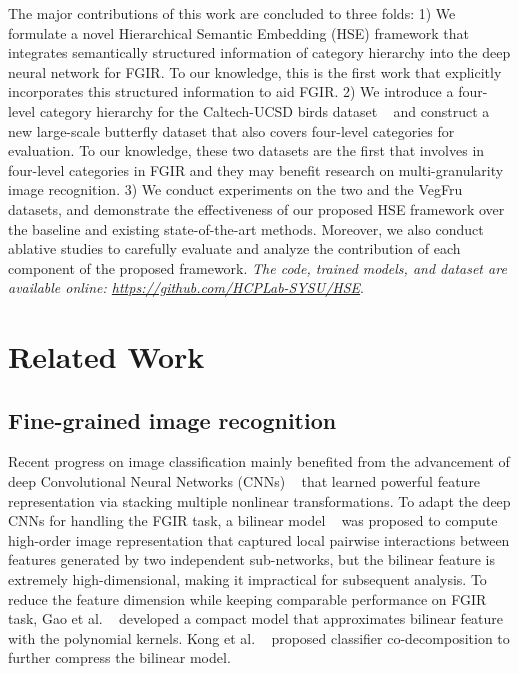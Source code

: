 \documentclass[sigconf]{acmart}
\begin{document}
The major contributions of this work are concluded to three folds: 1) We formulate a novel Hierarchical Semantic Embedding (HSE) framework that integrates semantically structured information of category hierarchy into the deep neural network for FGIR. To our knowledge, this is the first work that explicitly incorporates this structured information to aid FGIR. 2) We introduce a four-level category hierarchy for the Caltech-UCSD birds dataset ~\cite{wah2011caltech} and construct a new large-scale butterfly dataset that also covers four-level categories for evaluation. To our knowledge, these two datasets are the first that involves in four-level categories in FGIR and they may benefit research on multi-granularity image recognition. 3) We conduct experiments on the two and the VegFru ~\cite{hou2017vegfru} datasets, and demonstrate the effectiveness of our proposed HSE framework over the baseline and existing state-of-the-art methods. Moreover, we also conduct ablative studies to carefully evaluate and analyze the contribution of each component of the proposed framework. \emph{The code, trained models, and dataset are available online: \url{https://github.com/HCPLab-SYSU/HSE}}.








\section{Related Work}

\subsection{Fine-grained image recognition}
Recent progress on image classification mainly benefited from the advancement of deep Convolutional Neural Networks (CNNs) ~\cite{lecun1998gradient,krizhevsky2012imagenet,simonyan2014very,he2016deep,chen2018learning,chen2016disc} that learned powerful feature representation via stacking multiple nonlinear transformations. To adapt the deep CNNs for handling the FGIR task, a bilinear model ~\cite{lin2015bilinear} was proposed to compute high-order image representation that captured local pairwise interactions between features generated by two independent sub-networks, but the bilinear feature is extremely high-dimensional, making it impractical for subsequent analysis. To reduce the feature dimension while keeping comparable performance on FGIR task, Gao et al. ~\cite{gao2016compact} developed a compact model that approximates bilinear feature with the polynomial kernels. Kong et al. ~\cite{kong2016low} proposed classifier co-decomposition to further compress the bilinear model.
\end{document}
